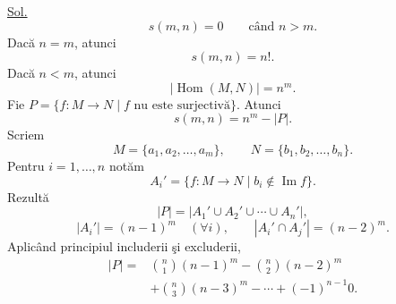 \noindent\underline{Sol.}
\[
 s(m,n)=0\qquad\text{când }n>m.
\]
\noindent Dacă $n=m$, atunci
\[
 s(m,n)=n!.
\]
\noindent Dacă $n<m$, atunci
\[
 |\operatorname{Hom}(M,N)|=n^m.
\]
\noindent Fie $P=\{f:M\longrightarrow N\mid f\text{ nu este surjectivă}\}$.
Atunci
\[
 s(m,n)=n^m-|P|.
\]
\noindent Scriem
\[
 M=\{a_1,a_2,\ldots,a_m\},\qquad
 N=\{b_1,b_2,\ldots,b_n\}.
\]
\noindent Pentru $i=1,\ldots,n$ notăm
\[
 A_i'=\{f:M\longrightarrow N\mid b_i\notin\operatorname{Im}f\}.
\]
\noindent Rezultă
\[
 |P|=\bigl|A_1'\cup A_2'\cup\cdots\cup A_n'\bigr|,
\]
\[
 |A_i'|=(n-1)^m\quad(\forall i),\qquad
 |A_i'\cap A_j'|=(n-2)^m.
\]
\noindent Aplicând principiul includerii şi excluderii,
\[
\begin{aligned}
 |P|={}&\binom{n}{1}(n-1)^m
       -\binom{n}{2}(n-2)^m\\
      &+\binom{n}{3}(n-3)^m-\cdots
       +(-1)^{n-1}0.
\end{aligned}
\]
